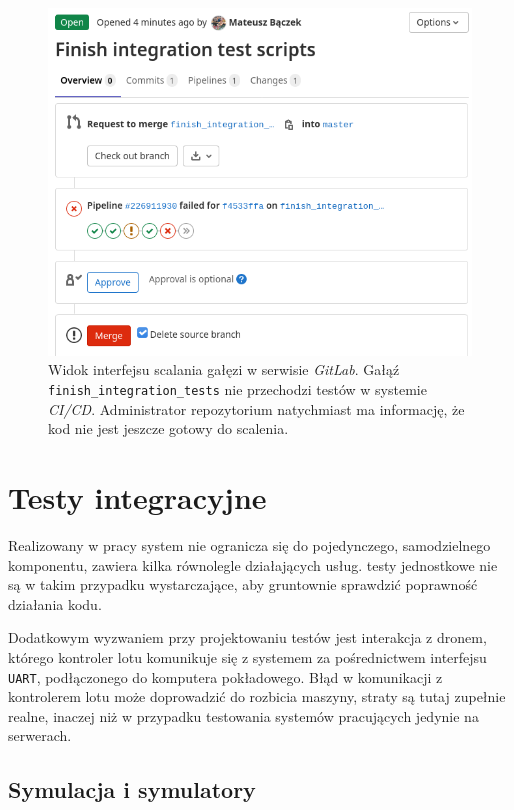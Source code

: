 \begin{figure}[H]
	\centering
	\includegraphics[width=0.8\linewidth]{rys05/failed_pipeline.png}
    \caption{
        Widok interfejsu scalania gałęzi w serwisie \textit{GitLab}.
        Gałąź \texttt{finish\_integration\_tests} nie przechodzi testów
        w systemie \textit{CI/CD}. Administrator repozytorium natychmiast
        ma informację, że kod nie jest jeszcze gotowy do scalenia.
    }
	\label{failed_pipeline}
\end{figure}


\section{Testy integracyjne}

Realizowany w pracy system nie ogranicza się do pojedynczego,
samodzielnego komponentu, zawiera kilka równolegle działających
usług. testy jednostkowe nie są w takim przypadku wystarczające,
aby gruntownie sprawdzić poprawność działania kodu. 

Dodatkowym wyzwaniem przy projektowaniu testów jest interakcja z dronem,
którego kontroler lotu komunikuje się z systemem za pośrednictwem 
interfejsu \texttt{UART}, podłączonego do komputera pokładowego.
Błąd w komunikacji z kontrolerem lotu może doprowadzić do 
rozbicia maszyny, straty są tutaj zupełnie realne, inaczej
niż w przypadku testowania systemów pracujących jedynie na serwerach. 

\subsection{
    Symulacja i symulatory
    \color{white}\cite{simulation_and_simulacra}}

